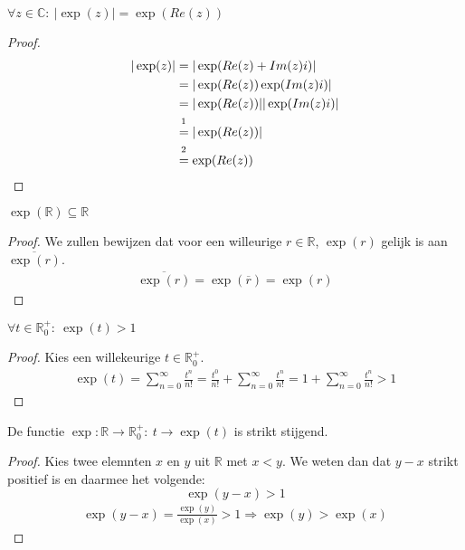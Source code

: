 \documentclass[main.tex]{subfiles}
\begin{document}
\begin{bpr}
  $\forall z \in \mathbb{C}:\ |\exp(z)| = \exp(Re(z))$

  \begin{proof}
    \begin{align*}
      |\exp(z)|
      &= |\exp(Re(z) + Im(z)i)|\\
      &= |\exp(Re(z))\exp(Im(z)i)|\\
      &= |\exp(Re(z))||\exp(Im(z)i)|\\
      &\overset{\prref{pr:lengte-imaginaire-exponentiatie-1}}{=} |\exp(Re(z))|\\
      &\overset{\prref{pr:reele-exponentiatie-positief}}{=} \exp(Re(z))\\
    \end{align*}
  \end{proof}
\end{bpr}

\begin{pr}
  $\exp(\mathbb{R}) \subseteq \mathbb{R}$

  \begin{proof}
    We zullen bewijzen dat voor een willeurige $r\in \mathbb{R}$, $\exp(r)$ gelijk is aan $\overline{\exp(r)}$.
    \begin{align*}
      \overline{\exp(r)}
      =
      \exp\left(\overline{r}\right) = \exp(r)
    \end{align*}
  \end{proof}
\end{pr}

\begin{bpr}
  \label{pr:exp-van-positief-getal-groter-dan-1}
  $\forall t \in \mathbb{R}_{0}^{+}:\ \exp(t) > 1$

  \begin{proof}
    Kies een willekeurige $t\in \mathbb{R}_{0}^{+}$.
    \begin{align*}
      \exp(t)
      = \sum_{n=0}^{\infty}\frac{t^{n}}{n!}
      = \frac{t^{0}}{n!} + \sum_{n=0}^{\infty}\frac{t^{n}}{n!}
      = 1 + \sum_{n=0}^{\infty}\frac{t^{n}}{n!}
      > 1
    \end{align*}
  \end{proof}
\end{bpr}

\begin{bpr}
  \label{pr:exponent-naar-oneindig-oneindig}
  De functie $\exp: \mathbb{R} \rightarrow \mathbb{R}_{0}^{+}:\ t \rightarrow \exp(t)$ is strikt stijgend.

  \begin{proof}
    Kies twee elemnten $x$ en $y$ uit $\mathbb{R}$ met $x < y$.
    We weten dan dat $y-x$ strikt positief is en daarmee het volgende:
    \[ \exp(y-x) > 1 \]
    \begin{align*}
      \exp(y-x)
      = \frac{\exp(y)}{\exp(x)}
      > 1 \Rightarrow \exp(y)
      > \exp(x)
    \end{align*}
  \end{proof}
\end{bpr}
\end{document}
